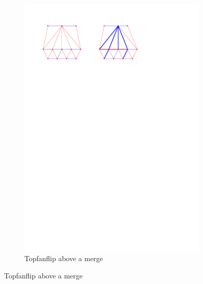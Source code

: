 \begin{figure}
\begin{subfigure}[b]{0.45 \textwidth}
        \includegraphics[width = \textwidth]{topFanFlips/img/merge}
        \caption{Topfanflip above a merge}
        \label{fig:fanflip:merge}


\end{subfigure}
\end{figure}
